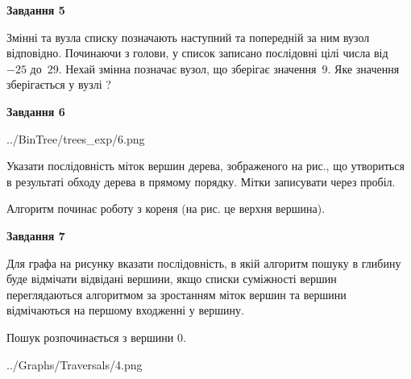 \documentclass[12pt, ukrainian]{article}
\begin{document}
{\begin {large}
{\begin {center}\textbf{Завдання 5}\end {center}}\par
Змінні  та  вузла списку позначають наступний та попередній за ним вузол відповідно. Починаючи з голови, у список записано послідовні цілі числа від~$-25$ до~$29$. Нехай змінна  позначає вузол, що зберігає значення~$9$.
Яке значення зберігається у вузлі  ?\par
\newpage

{\begin {center}\textbf{Завдання 6}\end {center}}\par

\begin{center}
	{../BinTree/trees_exp/6.png}
\end{center}
Указати послідовність міток вершин дерева, зображеного на рис., що утвориться в результаті обходу дерева в прямому порядку. Мітки записувати через пробіл.\par Алгоритм починає роботу з кореня (на рис. це верхня вершина).\par
\newpage

{\begin {center}\textbf{Завдання 7}\end {center}}\par
Для графа на рисунку вказати послідовність, в якій алгоритм пошуку в глибину буде відмічати відвідані вершини, якщо списки суміжності вершин переглядаються алгоритмом за зростанням міток вершин та вершини відмічаються на першому вход\-женні у вершину.\par
Пошук розпочинається з вершини 0.\par

\begin{center}
	{../Graphs/Traversals/4.png}
\end{center}\par
\newpage


\end{large}}
\end{document}
